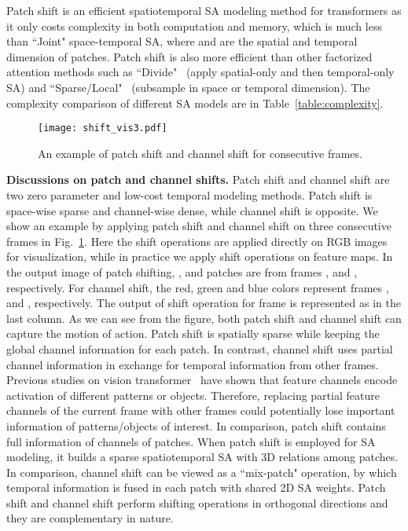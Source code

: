 \documentclass[runningheads]{llncs}
\begin{document}
	Patch shift is an efficient spatiotemporal SA modeling method for transformers as it only costs  complexity in both computation and memory, which is much less than ``Joint" space-temporal SA, where  and  are the spatial and temporal dimension of patches. Patch shift is also more efficient than other factorized attention methods such as ``Divide"~\cite{GedasBertasius2021IsSA,AnuragArnab2021ViViTAV} (apply spatial-only and then temporal-only SA) and ``Sparse/Local"~\cite{GedasBertasius2021IsSA,ZeLiu2021VideoST} (subsample in space or temporal dimension). The complexity comparison of different SA models are in Table~\ref{table:complexity}. 
	
	
	\begin{figure}[t]
		\setlength{\abovecaptionskip}{-1.mm}
		\setlength{\belowcaptionskip}{-1.mm}
		\begin{center}
			\texttt{[image: shift\_vis3.pdf]}		
			\caption{An example of patch shift and channel shift for consecutive frames.}
			\label{fig:shift_vis}
		\end{center}
		
	\end{figure}
	
	
	\textbf{Discussions on patch and channel shifts.} Patch shift and channel shift are two zero parameter and low-cost temporal modeling methods. Patch shift is space-wise sparse and channel-wise dense, while channel shift is opposite. We show an example by applying patch shift and channel shift on three consecutive frames in Fig.~\ref{fig:shift_vis}. Here the shift operations are applied directly on RGB images for visualization, while in practice we apply shift operations on feature maps. In the output image of patch shifting, ,  and  patches are from frames ,  and , respectively. For channel shift, the red, green and blue colors represent frames ,   and , respectively. The output of shift operation for frame  is represented as  in the last column. As we can see from the figure, both patch shift and channel shift can capture the motion of action. Patch shift is spatially sparse while keeping the global channel information for each patch. In contrast, channel shift uses partial channel information in exchange for temporal information from other frames. Previous studies on vision transformer~\cite{chen2021crossvit} have shown that feature channels encode activation of different patterns or objects. Therefore, replacing partial feature channels of the current frame with other frames could potentially lose important information of patterns/objects of interest. In comparison, patch shift contains full information of channels of patches. When patch shift is employed for SA modeling, it builds a sparse spatiotemporal SA with 3D relations among patches. In comparison, channel shift can be viewed as a ``mix-patch" operation, by which temporal information is fused in each patch with shared 2D SA weights. Patch shift and channel shift perform shifting operations in orthogonal directions and they are complementary in nature. 
	
\end{document}
